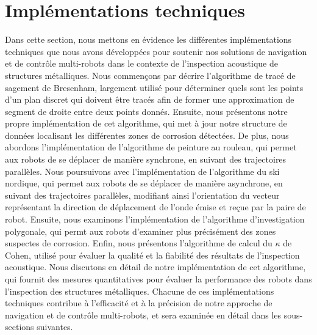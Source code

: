 \documentclass[francais,RandD]{rapportPFE}
\begin{document}
	\section{Implémentations techniques}
		Dans cette section, nous mettons en évidence les différentes implémentations techniques que nous avons développées pour soutenir nos solutions de navigation et de contrôle multi-robots dans le contexte de l'inspection acoustique de structures métalliques.
		Nous commençons par décrire l'algorithme de tracé de sagement de Bresenham, largement utilisé pour déterminer quels sont les points d'un plan discret qui doivent être tracés afin de former une approximation de segment de droite entre deux points donnés.
		Ensuite, nous présentons notre propre implémentation de cet algorithme, qui met à jour notre structure de données localisant les différentes zones de corrosion détectées.
		De plus, nous abordons l'implémentation de l'algorithme de peinture au rouleau, qui permet aux robots de se déplacer de manière synchrone, en suivant des trajectoires parallèles.
		Nous poursuivons avec l'implémentation de l'algorithme du ski nordique, qui permet aux robots de se déplacer de manière asynchrone, en suivant des trajectoires parallèles, modifiant ainsi l'orientation du vecteur représentant la direction de déplacement de l'onde émise et reçue par la paire de robot.
		Ensuite, nous examinons l'implémentation de l'algorithme d'investigation polygonale, qui permt aux robots d'examiner plus précisément des zones suspectes de corrosion.
		Enfin, nous présentons l'algorithme de calcul du $\kappa$ de Cohen, utilisé pour évaluer la qualité et la fiabilité des résultats de l'inspection acoustique. Nous discutons en détail de notre implémentation de cet algorithme, qui fournit des mesures quantitatives pour évaluer la performance des robots dans l'inspection des structures métalliques. Chacune de ces implémentations techniques contribue à l'efficacité et à la précision de notre approche de navigation et de contrôle multi-robots, et sera examinée en détail dans les sous-sections suivantes.
\end{document}
